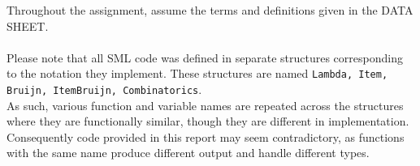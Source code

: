 \documentclass[11pt]{article}
\begin{document}
\maketitle


Throughout the assignment, assume the terms and definitions given in the DATA SHEET.
\\
\\
Please note that all SML code was defined in separate structures corresponding to the notation they implement. These structures are named \texttt{Lambda, Item, Bruijn, ItemBruijn, Combinatorics}. \\
As such, various function and variable names are repeated across the structures where they are functionally similar, though they are different in implementation. Consequently code provided in this report may seem contradictory, as functions with the same name produce different output and handle different types.
\end{document}
